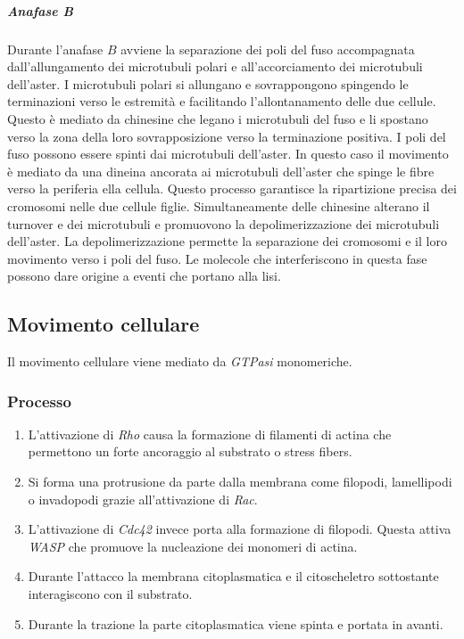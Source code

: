 				\subparagraph{Anafase \emph{B}}
				Durante l'anafase $B$ avviene la separazione dei poli del fuso accompagnata dall'allungamento dei microtubuli polari e all'accorciamento dei microtubuli dell'aster.
				I microtubuli polari si allungano e sovrappongono spingendo le terminazioni verso le estremit\`a e facilitando l'allontanamento delle due cellule.
				Questo \`e mediato da chinesine che legano i microtubuli del fuso e li spostano verso la zona della loro sovrapposizione verso la terminazione positiva.
				I poli del fuso possono essere spinti dai microtubuli dell'aster.
				In questo caso il movimento \`e mediato da una dineina ancorata ai microtubuli dell'aster che spinge le fibre verso la periferia ella cellula.
				Questo processo garantisce la ripartizione precisa dei cromosomi nelle due cellule figlie.
				Simultaneamente delle chinesine alterano il turnover e dei microtubuli e promuovono la depolimerizzazione dei microtubuli dell'aster.
				La depolimerizzazione permette la separazione dei cromosomi e il loro movimento verso i poli del fuso.
				Le molecole che interferiscono in questa fase possono dare origine a eventi che portano alla lisi.

	\subsection{Movimento cellulare}
	Il movimento cellulare viene mediato da \emph{GTPasi} monomeriche.

		\subsubsection{Processo}
		\begin{multicols}{2}
			\begin{enumerate}
				\item L'attivazione di \emph{Rho} causa la formazione di filamenti di actina che permettono un forte ancoraggio al substrato o stress fibers.
				\item Si forma una protrusione da parte dalla membrana come filopodi, lamellipodi o invadopodi grazie all'attivazione di \emph{Rac}.
				\item L'attivazione di \emph{Cdc42} invece porta alla formazione di filopodi.
					Questa attiva \emph{WASP} che promuove la nucleazione dei monomeri di actina.
				\item Durante l'attacco la membrana citoplasmatica e il citoscheletro sottostante interagiscono con il substrato.
				\item Durante la trazione la parte citoplasmatica viene spinta e portata in avanti.
			\end{enumerate}
		\end{multicols}




